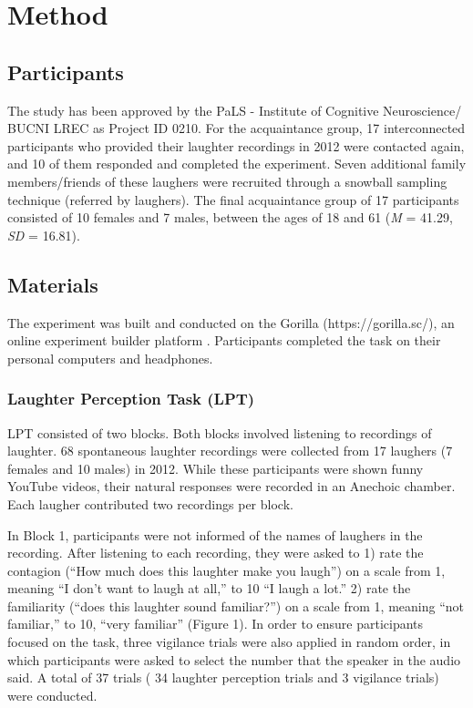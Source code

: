 \section{Method}
\subsection{Participants}
The study has been approved by the PaLS - Institute of Cognitive Neuroscience/ BUCNI LREC as Project ID 0210. For the acquaintance group, 17 interconnected participants who provided their laughter recordings in 2012 were contacted again, and 10 of them responded and completed the experiment. Seven additional family members/friends of these laughers were recruited through a snowball sampling technique (referred by laughers). The final acquaintance group of 17 participants consisted of 10 females and 7 males, between the ages of 18 and 61 (\textit{M }= 41.29, \textit{SD} = 16.81).

\subsection{Materials}
The experiment was built and conducted on the Gorilla (https://gorilla.sc/), an online experiment builder platform \citep {anwyl2020gorilla}. Participants completed the task on their personal computers and headphones.

\subsubsection{Laughter Perception Task (LPT)}

LPT consisted of two blocks. Both blocks involved listening to recordings of laughter. 68 spontaneous laughter recordings were collected from 17 laughers (7 females and 10 males) in 2012. While these participants were shown funny YouTube videos, their natural responses were recorded in an Anechoic chamber. Each laugher contributed two recordings per block.

In Block 1, participants were not informed of the names of laughers in the recording. After listening to each recording, they were asked to 1) rate the contagion (“How much does this laughter make you laugh”) on a scale from 1, meaning “I don’t want to laugh at all,” to 10 “I laugh a lot.” 2) rate the familiarity (“does this laughter sound familiar?”) on a scale from 1, meaning “not familiar,” to 10, “very familiar” (Figure 1). In order to ensure participants focused on the task, three vigilance trials were also applied in random order, in which participants were asked to select the number that the speaker in the audio said. A total of 37 trials ( 34 laughter perception trials and 3 vigilance trials) were conducted.

